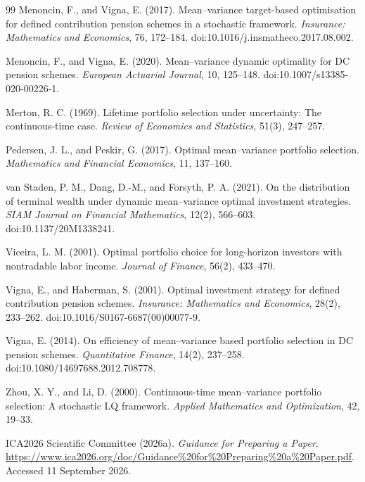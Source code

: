 \documentclass[11pt,a4paper]{article}
\numberwithin{equation}{section}
\numberwithin{table}{section}
\numberwithin{figure}{section}
\theoremstyle{plain}
\theoremstyle{definition}
\begin{document}
\begin{thebibliography}{99}
Menoncin, F., and Vigna, E. (2017).
Mean--variance target-based optimisation for defined contribution pension schemes in a stochastic framework.
\emph{Insurance: Mathematics and Economics}, 76, 172--184.
doi:10.1016/j.insmatheco.2017.08.002.

Menoncin, F., and Vigna, E. (2020).
Mean--variance dynamic optimality for DC pension schemes.
\emph{European Actuarial Journal}, 10, 125--148.
doi:10.1007/s13385-020-00226-1.

Merton, R. C. (1969).
Lifetime portfolio selection under uncertainty: The continuous-time case.
\emph{Review of Economics and Statistics}, 51(3), 247--257.

Pedersen, J. L., and Peskir, G. (2017).
Optimal mean--variance portfolio selection.
\emph{Mathematics and Financial Economics}, 11, 137--160.

van Staden, P. M., Dang, D.-M., and Forsyth, P. A. (2021).
On the distribution of terminal wealth under dynamic mean--variance optimal investment strategies.
\emph{SIAM Journal on Financial Mathematics}, 12(2), 566--603.
doi:10.1137/20M1338241.

Viceira, L. M. (2001).
Optimal portfolio choice for long-horizon investors with nontradable labor income.
\emph{Journal of Finance}, 56(2), 433--470.

Vigna, E., and Haberman, S. (2001).
Optimal investment strategy for defined contribution pension schemes.
\emph{Insurance: Mathematics and Economics}, 28(2), 233--262.
doi:10.1016/S0167-6687(00)00077-9.

Vigna, E. (2014).
On efficiency of mean--variance based portfolio selection in DC pension schemes.
\emph{Quantitative Finance}, 14(2), 237--258.
doi:10.1080/14697688.2012.708778.

Zhou, X. Y., and Li, D. (2000).
Continuous-time mean--variance portfolio selection: A stochastic LQ framework.
\emph{Applied Mathematics and Optimization}, 42, 19--33.

ICA2026 Scientific Committee (2026a).
\emph{Guidance for Preparing a Paper}.
\url{https://www.ica2026.org/doc/Guidance%20for%20Preparing%20a%20Paper.pdf}.
Accessed 11 September 2026.


\end{thebibliography}
\end{document}
